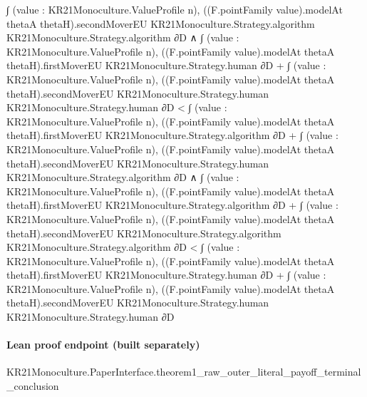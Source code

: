 \documentclass[10pt]{article}
\begin{document}
\begin{ReviewVerbatim}
          ∫ (value : KR21Monoculture.ValueProfile n),
            ((F.pointFamily value).modelAt thetaA thetaH).secondMoverEU KR21Monoculture.Strategy.algorithm
              KR21Monoculture.Strategy.algorithm ∂D ∧
      ∫ (value : KR21Monoculture.ValueProfile n),
              ((F.pointFamily value).modelAt thetaA thetaH).firstMoverEU KR21Monoculture.Strategy.human ∂D +
            ∫ (value : KR21Monoculture.ValueProfile n),
              ((F.pointFamily value).modelAt thetaA thetaH).secondMoverEU KR21Monoculture.Strategy.human
                KR21Monoculture.Strategy.human ∂D <
          ∫ (value : KR21Monoculture.ValueProfile n),
              ((F.pointFamily value).modelAt thetaA thetaH).firstMoverEU KR21Monoculture.Strategy.algorithm ∂D +
            ∫ (value : KR21Monoculture.ValueProfile n),
              ((F.pointFamily value).modelAt thetaA thetaH).secondMoverEU KR21Monoculture.Strategy.human
                KR21Monoculture.Strategy.algorithm ∂D ∧
        ∫ (value : KR21Monoculture.ValueProfile n),
              ((F.pointFamily value).modelAt thetaA thetaH).firstMoverEU KR21Monoculture.Strategy.algorithm ∂D +
            ∫ (value : KR21Monoculture.ValueProfile n),
              ((F.pointFamily value).modelAt thetaA thetaH).secondMoverEU KR21Monoculture.Strategy.algorithm
                KR21Monoculture.Strategy.algorithm ∂D <
          ∫ (value : KR21Monoculture.ValueProfile n),
              ((F.pointFamily value).modelAt thetaA thetaH).firstMoverEU KR21Monoculture.Strategy.human ∂D +
            ∫ (value : KR21Monoculture.ValueProfile n),
              ((F.pointFamily value).modelAt thetaA thetaH).secondMoverEU KR21Monoculture.Strategy.human
                KR21Monoculture.Strategy.human ∂D
\end{ReviewVerbatim}

\paragraph{Lean proof endpoint (built separately)}\begin{ReviewVerbatim}
KR21Monoculture.PaperInterface.theorem1_raw_outer_literal_payoff_terminal_conclusion
\end{ReviewVerbatim}
\end{document}
